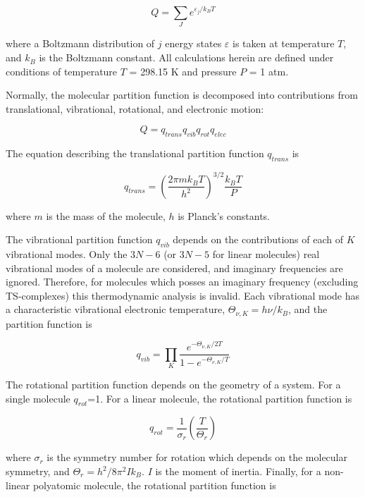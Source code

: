 \begin{equation}
  Q = \sum_J e^{\varepsilon_j/k_BT}
\end{equation}

\noindent where a Boltzmann distribution of $j$ energy states $\varepsilon$ is
taken at temperature $T$, and $k_B$ is the Boltzmann constant. All calculations
herein are defined under conditions of temperature $T$ = 298.15 K and pressure
$P$ = 1 atm.

Normally, the molecular partition function is decomposed into contributions from
translational, vibrational, rotational, and electronic motion:

\begin{equation}
  Q = q_{trans}q_{vib}q_{rot}q_{elec}
\end{equation}

\noindent The equation describing the translational partition function
$q_{trans}$ is

\begin{equation}
  q_{trans} = \left( \frac{2\pi m k_B T}{h^2} \right)^{3/2} \frac{k_BT}{P}
\end{equation}

\noindent where $m$ is the mass of the molecule, $h$ is Planck's constants.

The vibrational partition function $q_{vib}$ depends on the contributions of
each of $K$ vibrational modes. Only the $3N-6$ (or $3N-5$ for linear molecules)
real vibrational modes of a molecule are considered, and imaginary frequencies
are ignored. Therefore, for molecules which posses an imaginary frequency
(excluding TS-complexes) this thermodynamic analysis is invalid. Each
vibrational mode has a characteristic vibrational electronic temperature,
$\Theta_{\nu,K} = h\nu/k_B$, and the partition function is

\begin{equation}
  q_{vib} = \prod_K \frac{e^{-\Theta_{\nu,K}/2T}}{1 - e^{-\Theta_{\nu,K}/T}}
\end{equation}

The rotational partition function depends on the geometry of a system. For a
single molecule $q_{rot}$=1. For a linear molecule, the rotational partition
function is

\begin{equation}
  q_{rot} = \frac{1}{\sigma_r} \left(\frac{T}{\Theta_r}\right)
\end{equation}

\noindent where $\sigma_r$ is the symmetry number for rotation which depends on
the molecular symmetry, and $\Theta_r = h^2/8\pi^2Ik_B$. $I$ is the moment of
inertia. Finally, for a non-linear polyatomic molecule, the rotational partition
function is

